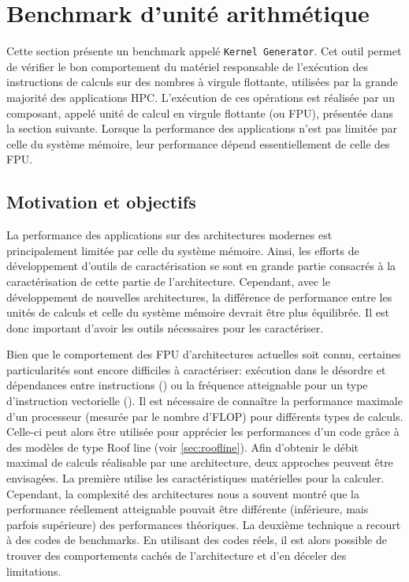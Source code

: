 \section{Benchmark d'unité arithmétique}\label{sec:kg}


    Cette section présente un benchmark appelé \verb=Kernel Generator=. Cet outil permet de vérifier le bon comportement du matériel responsable de l'exécution des instructions de calculs sur des nombres à virgule flottante, utilisées par la grande majorité des applications HPC. L'exécution de ces opérations est réalisée par un composant, appelé unité de calcul en virgule flottante (ou \gls{FPU}), présentée dans la section suivante. Lorsque la performance des applications n'est pas limitée par celle du système mémoire, leur performance dépend essentiellement de celle des FPU. 



\subsection{Motivation et objectifs}
    
    La performance des applications sur des architectures modernes est principalement limitée par celle du système mémoire. Ainsi, les efforts de développement d'outils de caractérisation se sont en grande partie consacrés à la caractérisation de cette partie de l’architecture. Cependant, avec le développement de nouvelles architectures, la différence de performance entre les unités de calculs et celle du système mémoire devrait être plus équilibrée. Il est donc important d'avoir les outils nécessaires pour les caractériser.
    
    Bien que le comportement des FPU d'architectures actuelles soit connu, certaines particularités sont encore difficiles à caractériser: exécution dans le désordre et dépendances entre instructions () ou la fréquence atteignable pour un type d'instruction vectorielle ().
    Il est nécessaire de connaître la performance maximale d'un processeur (mesurée par le nombre d'\gls{FLOP}) pour différents types de calculs. Celle-ci peut alors être utilisée pour apprécier les performances d'un code grâce à des modèles de type Roof line (voir \autoref{sec:roofline}). Afin d'obtenir le débit maximal de calculs réalisable par une architecture, deux approches peuvent être envisagées. La première utilise les caractéristiques matérielles pour la calculer. Cependant, la complexité des architectures nous a souvent montré que la performance réellement atteignable pouvait être différente (inférieure, mais parfois supérieure) des performances théoriques. La deuxième technique a recourt à des codes de \glspl{benchmark}. En utilisant des codes réels, il est alors possible de trouver des comportements cachés de l'architecture et d'en déceler des limitations.
    
